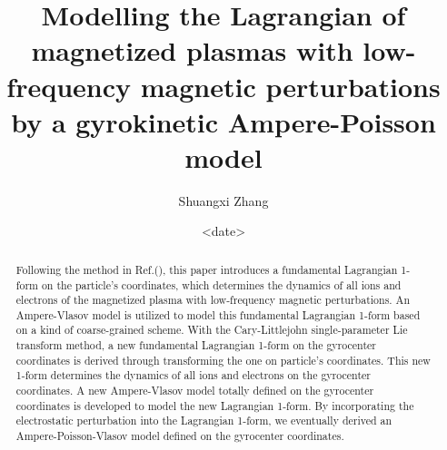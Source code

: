 \documentclass[12pt]{iopart}
\begin{document}
\title{Modelling the Lagrangian of magnetized plasmas  with low-frequency magnetic perturbations by a gyrokinetic Ampere-Poisson model}

\author{Shuangxi Zhang }


\address{Graduate School of Energy Science, Kyoto University, Uji, Kyoto 611-0011, Japan. }




\date{<date>}

\begin{abstract}
Following the method in Ref.(\cite{2017shuangxi}), this paper introduces a fundamental Lagrangian 1-form on the particle's coordinates, which determines the dynamics of all ions and electrons of the magnetized plasma with low-frequency magnetic perturbations. An Ampere-Vlasov model is utilized to model this fundamental Lagrangian 1-form based on a kind of coarse-grained scheme. With the Cary-Littlejohn single-parameter Lie transform method, a new fundamental Lagrangian 1-form on the gyrocenter coordinates is derived through transforming the one on particle's coordinates. This new 1-form determines the dynamics of all ions and electrons on the gyrocenter coordinates. A new Ampere-Vlasov model totally defined on the gyrocenter coordinates is developed to model the new Lagrangian 1-form. By incorporating the electrostatic perturbation into the Lagrangian 1-form, we eventually derived an Ampere-Poisson-Vlasov model defined on the gyrocenter coordinates.
\end{abstract}

\end{document}
